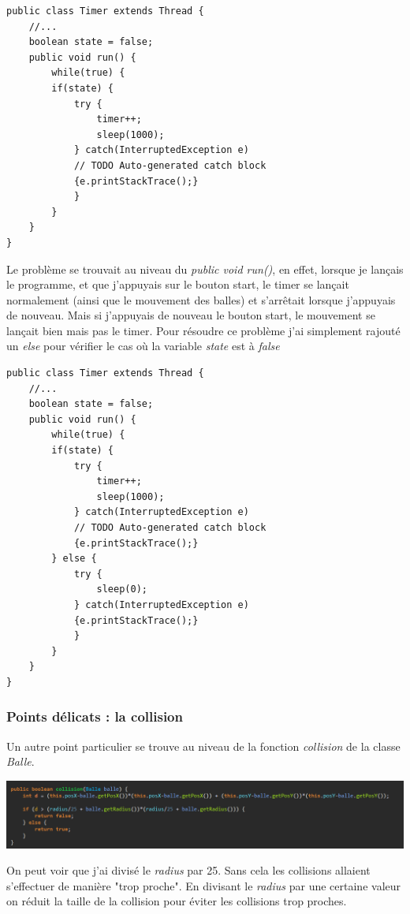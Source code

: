 \documentclass{article}
\begin{document}
\begin{verbatim}
public class Timer extends Thread {
    //...
    boolean state = false;
    public void run() {
        while(true) {
        if(state) {
            try {
                timer++;
                sleep(1000);
            } catch(InterruptedException e) 
            // TODO Auto-generated catch block
            {e.printStackTrace();}
            }
        }
    }
}			   
\end{verbatim}		

Le problème se trouvait au niveau du \textit{public void run()}, en effet, lorsque je lançais le programme, et que j'appuyais sur le bouton start, le timer se lançait normalement (ainsi que le mouvement des balles) et s'arrêtait lorsque j'appuyais de nouveau.
Mais si j'appuyais de nouveau le bouton start, le mouvement se lançait bien mais pas le timer.
\newline
Pour résoudre ce problème j'ai simplement rajouté un \textit{else} pour vérifier le cas où la variable \textit{state} est à \textit{false}

\newpage
\begin{verbatim}
public class Timer extends Thread {
    //...
    boolean state = false;
    public void run() {
        while(true) {
        if(state) {
            try {
                timer++;
                sleep(1000);
            } catch(InterruptedException e) 
            // TODO Auto-generated catch block
            {e.printStackTrace();}
        } else {
            try {
                sleep(0);
            } catch(InterruptedException e)
            {e.printStackTrace();}
            }
        }
    }
}			   
\end{verbatim}	


\subsubsection{Points délicats : la collision}
Un autre point particulier se trouve au niveau de la fonction \textit{collision} de la classe \textit{Balle}.

\begin{center}
	\includegraphics[scale=0.5]{Collision.png}
\end{center}
On peut voir que j'ai divisé le \textit{radius} par 25. Sans cela les collisions allaient s'effectuer de manière "trop proche".
\newline
En divisant le \textit{radius} par une certaine valeur on réduit la taille de la collision pour éviter les collisions trop proches.
\end{document}
